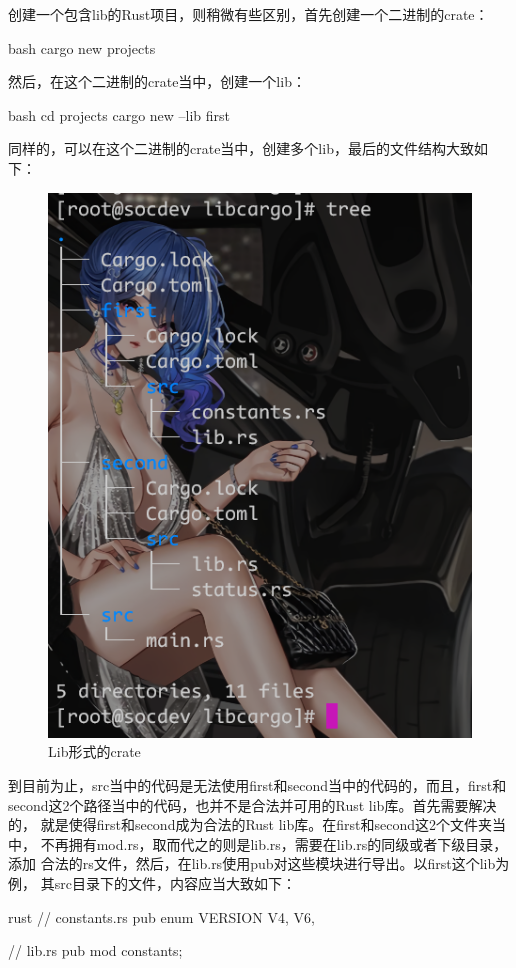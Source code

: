 创建一个包含lib的Rust项目，则稍微有些区别，首先创建一个二进制的crate：
\begin{code-block}{bash}
cargo new projects
\end{code-block}
然后，在这个二进制的crate当中，创建一个lib：
\begin{code-block}{bash}
cd projects
cargo new --lib first
\end{code-block}
同样的，可以在这个二进制的crate当中，创建多个lib，最后的文件结构大致如下：
\begin{figure}[H]
  \centering
  \includegraphics[scale=0.5]{rust_lib.png}
  \caption{Lib形式的crate}
  \label{fig:rust_lib}
\end{figure}

到目前为止，src当中的代码是无法使用first和second当中的代码的，而且，first和
second这2个路径当中的代码，也并不是合法并可用的Rust lib库。首先需要解决的，
就是使得first和second成为合法的Rust lib库。在first和second这2个文件夹当中，
不再拥有mod.rs，取而代之的则是lib.rs，需要在lib.rs的同级或者下级目录，添加
合法的rs文件，然后，在lib.rs使用pub对这些模块进行导出。以first这个lib为例，
其src目录下的文件，内容应当大致如下：
\begin{code-block}{rust}
// constants.rs
pub enum VERSION {
    V4,
    V6,
}

// lib.rs
pub mod constants;
\end{code-block}

